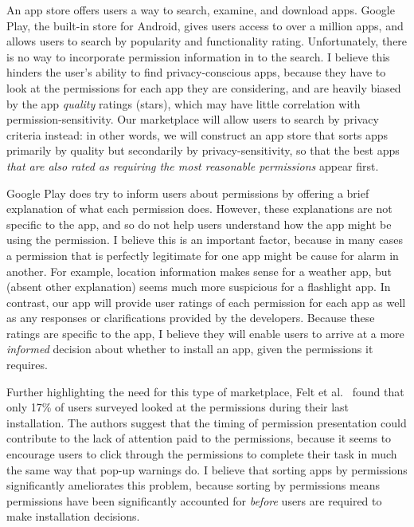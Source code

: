 \documentclass[11pt]{article}
\begin{document}
An app store offers users a way to search, examine, and download
apps.  Google Play, the built-in store for Android, gives
users access to over a million apps, and allows users to search by
popularity and functionality rating. Unfortunately, there is no way to incorporate
permission information in to the search. I believe this hinders the
user's ability to find privacy-conscious apps, because they have to
look at the permissions for each app they are considering, and are
heavily biased by the app \emph{quality} ratings (stars), which may
have little correlation with permission-sensitivity. Our marketplace
will allow users to search by privacy criteria instead: in other
words, we will construct an app store that sorts apps primarily by
quality but secondarily by privacy-sensitivity, so that the best apps
\emph{that are also rated as requiring the most reasonable
  permissions} appear first.

Google Play does try to inform users about permissions by offering a
brief explanation of what each permission does. However, these
explanations are not specific to the app, and so do not help
users understand how the app might be using the permission. I 
believe this is an important factor, because in many cases a
permission that is perfectly legitimate for one app might be cause for
alarm in another. For example, location information makes 
sense for a weather app, but (absent other explanation) seems much
more suspicious for a flashlight app. In contrast, our app will
provide user ratings of each permission for each app 
as well as any responses or clarifications provided by the
developers. Because these ratings are specific to the app, I believe
they will enable users to arrive at a more \emph{informed} decision about
whether to install an app, given the permissions it requires.

Further highlighting the need for this type of marketplace, 
Felt et al.\ \cite{android-attention-SOUPS12} 
found that only 17\% of users surveyed looked at the permissions during
their last installation. The authors suggest that the timing of
permission presentation could contribute to the lack of attention paid
to the permissions, because it seems to encourage users to click
through the permissions to complete their task in much the same way
that pop-up warnings do. I believe that sorting apps by permissions
significantly ameliorates this problem, because sorting by permissions
means permissions have been significantly accounted for \emph{before}
users are required to make installation decisions.
\end{document}
